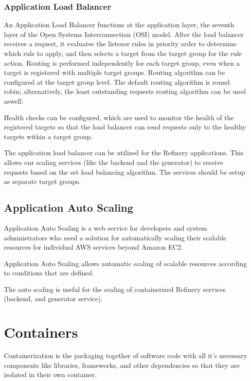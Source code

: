 		\subsubsection{Application Load Balancer} \label{backgalb}
			An Application Load Balancer \cite{elb} functions at the application layer, the seventh layer of the Open Systems Interconnection (OSI)
			model. After the load balancer receives a request, it evaluates the listener rules in priority order to determine which 
			rule to apply, and then selects a target from the target group for the rule action. 
			Routing is performed independently for each target group, even when a target is registered with multiple target groups. 
			Routing algorithm can be configured at the target group level. 
			The default routing algorithm is round robin; alternatively, the least outstanding requests routing algorithm can be used aswell.

			Health checks can be configured, which are used to monitor the health of the registered targets so that the 
			load balancer can send requests only to the healthy targets within a target group.

			The application load balancer can be utilized for the Refinery applications. This allows our scaling services (like the backend and 
			the generator) to receive requests based on the set load balancing algorithm. The services should be setup as separate target groups.

	\subsection{Application Auto Scaling} \label{backgautoscaling}
		Application Auto Scaling \cite{autoscale} is a web service for developers and system administrators 
		who need a solution for automatically scaling their scalable resources for individual AWS services beyond Amazon EC2. 

		Application Auto Scaling allows automatic scaling of scalable resources according to conditions that are defined.

		The auto scaling is useful for the scaling of containerized Refinery services (backend, and generator service).

\section{Containers} \label{backgcontainer}
	Containerization \cite{container} is the packaging together of software code with all it’s necessary 
	components like 
	libraries, frameworks, and other dependencies so that they are isolated in their own container.
	
